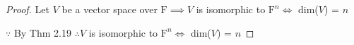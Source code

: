 \begin{proof}
	Let $V$ be a vector space over $\mathrm{F} \implies V$ is isomorphic to $\mathrm{F}^n \Leftrightarrow $ dim($V$) = $n$
	
	$\because $ By Thm 2.19 $\therefore V$ is isomorphic to $\mathrm{F}^n \Leftrightarrow$ dim($V$) = $n$
\end{proof}
